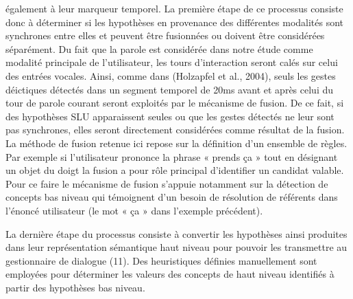 \documentclass[a4paper,11pt,twoside]{StyleThese}
\begin{document}
\begin{itemize}
également à leur marqueur temporel.
La première étape de ce processus consiste donc à déterminer si les hypothèses en
provenance des différentes modalités sont synchrones entre elles et peuvent être fusionnées
ou doivent être considérées séparément. Du fait que la parole est considérée
dans notre étude comme modalité principale de l’utilisateur, les tours d’interaction seront calés sur celui des entrées vocales. Ainsi, comme dans \cite{}
(Holzapfel et al., 2004), seuls les gestes déictiques détectés dans un segment temporel de 20ms avant et après celui du tour de parole courant seront exploités par le mécanisme de fusion. De ce fait, si des hypothèses SLU apparaissent seules ou que les gestes détectés ne leur sont pas synchrones, elles seront directement considérées comme résultat de la fusion. La méthode de fusion retenue ici repose sur la définition d’un ensemble
de règles.
Par exemple si l’utilisateur prononce la
phrase « prends ça » tout en désignant un objet du doigt la fusion a pour rôle principal
d’identifier un candidat valable. Pour ce faire le mécanisme de fusion s’appuie notamment
sur la détection de concepts bas niveau qui témoignent d’un besoin de résolution
de référents dans l’énoncé utilisateur (le mot « ça » dans l’exemple précédent).

La dernière étape du processus consiste à convertir les hypothèses ainsi produites
dans leur représentation sémantique haut niveau pour pouvoir les transmettre au gestionnaire de dialogue (11).
Des heuristiques définies manuellement sont employées pour déterminer les valeurs
des concepts de haut niveau identifiés à partir des hypothèses bas niveau.
\end{itemize}




\end{document}
